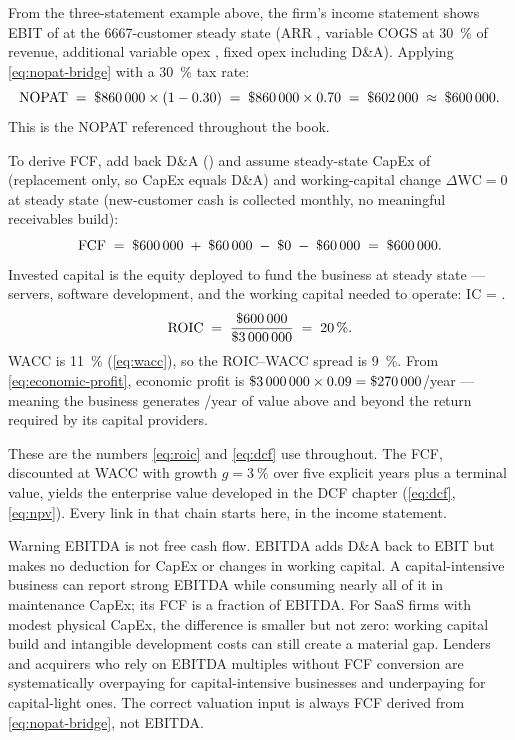 \begin{example}
From the three-statement example above, the firm's income statement shows EBIT of
 at the \num{6667}-customer steady state (ARR , variable COGS
 at \qty{30}{\percent} of revenue, additional variable opex ,
fixed opex  including  D\&A). Applying \cref{eq:nopat-bridge}
with a \qty{30}{\percent} tax rate:
\[
  \mathrm{NOPAT} \;=\; \$\num{860000} \times (1 - 0.30) \;=\; \$\num{860000} \times 0.70 \;=\; \$\num{602000} \;\approx\; \$\num{600000}.
\]
This is the  NOPAT referenced throughout the book.

To derive FCF, add back D\&A () and assume steady-state CapEx of 
(replacement only, so CapEx equals D\&A) and working-capital change \(\Delta\mathrm{WC} = 0\)
at steady state (new-customer cash is collected monthly, no meaningful receivables build):
\[
  \mathrm{FCF} \;=\; \$\num{600000} \;+\; \$\num{60000} \;-\; \$\num{0} \;-\; \$\num{60000} \;=\; \$\num{600000}.
\]
Invested capital is the equity deployed to fund the business at steady state --- servers,
software development, and the working capital needed to operate: IC = .
\[
  \mathrm{ROIC} \;=\; \frac{\$\num{600000}}{\$\num{3000000}} \;=\; \qty{20}{\percent}.
\]
WACC is \qty{11}{\percent} (\cref{eq:wacc}), so the ROIC--WACC spread is \qty{9}{\percent}.
From \cref{eq:economic-profit}, economic profit is \(\$\num{3000000} \times 0.09 =
\$\num{270000}\)/year --- meaning the business generates /year of value above
and beyond the return required by its capital providers.

These are the numbers \cref{eq:roic} and \cref{eq:dcf} use throughout. The 
FCF, discounted at WACC with growth \(g = \qty{3}{\percent}\) over five explicit years plus
a terminal value, yields the enterprise value developed in the DCF chapter (\cref{eq:dcf},
\cref{eq:npv}). Every link in that chain starts here, in the income statement.
\end{example}

\begin{admonition}{Warning}
EBITDA is not free cash flow. EBITDA adds D\&A back to EBIT but makes no deduction for CapEx
or changes in working capital. A capital-intensive business can report strong EBITDA while
consuming nearly all of it in maintenance CapEx; its FCF is a fraction of EBITDA. For SaaS
firms with modest physical CapEx, the difference is smaller but not zero: working capital
build and intangible development costs can still create a material gap. Lenders and acquirers
who rely on EBITDA multiples without FCF conversion are systematically overpaying for
capital-intensive businesses and underpaying for capital-light ones. The correct valuation
input is always FCF derived from \cref{eq:nopat-bridge}, not EBITDA.
\end{admonition}

